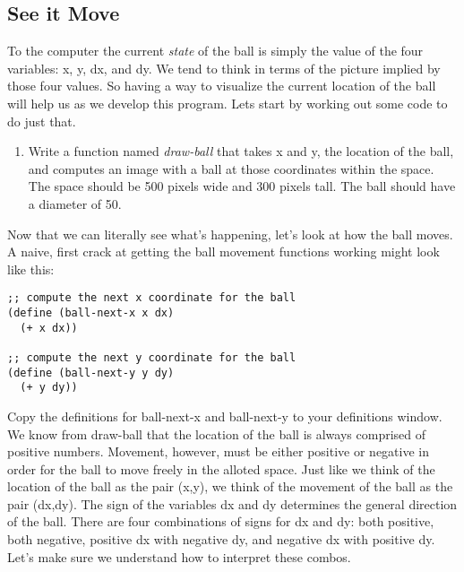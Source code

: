 \documentclass[nobib]{tufte-handout}
\begin{document}
\subsection*{See it Move}

To the computer the current \textit{state} of the ball is simply the value of the four variables: x, y, dx, and dy. We tend to think in terms of the picture implied by those four values. So having a way to visualize the current location of the ball will help us as we develop this program.  Lets start by working out some code to do just that.

\begin{enumerate}
\item Write a function named \textit{draw-ball} that takes x and y, the location of the ball, and computes an image with a ball at those coordinates within the space. The space should be 500 pixels wide and 300 pixels tall. The ball should have a diameter of 50.
\end{enumerate}

Now that we can literally see what's happening, let's look at how the ball moves. A naive, first crack at getting the ball movement functions working might look like this:

\begin{lstlisting}
;; compute the next x coordinate for the ball
(define (ball-next-x x dx)
  (+ x dx))

;; compute the next y coordinate for the ball
(define (ball-next-y y dy)
  (+ y dy))
\end{lstlisting}

Copy the definitions for ball-next-x and ball-next-y to your definitions window. We know from draw-ball that the location of the ball is always comprised of positive numbers. Movement, however, must be either positive or negative in order for the ball to move freely in the alloted space. Just like we think of the location of the ball as the pair (x,y), we think of the movement of the ball as the pair (dx,dy).  The sign of the variables dx and dy determines the general direction of the ball. There are four combinations of signs for dx and dy: both positive, both negative, positive dx with negative dy, and negative dx with positive dy. Let's make sure we understand how to interpret these combos.
\end{document}

